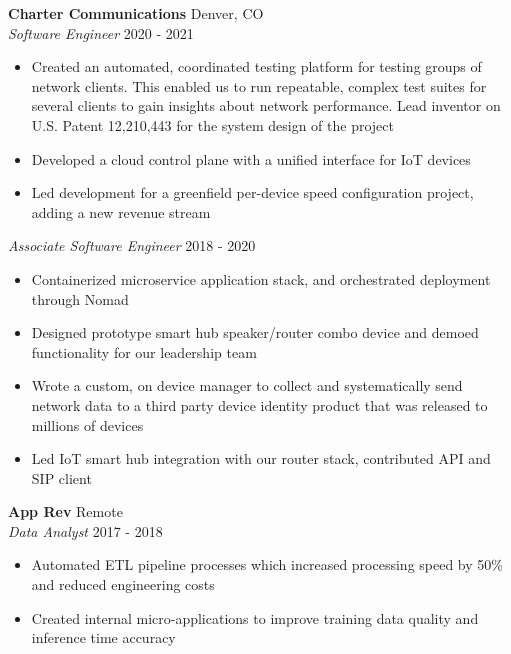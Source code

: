 \documentclass[a4paper]{article}
\begin{document}
\textbf{Charter Communications} \hfill Denver, CO\\

\textit{Software Engineer} \hfill 2020 - 2021\\
\vspace{-1mm}
\begin{itemize} \itemsep 1pt
  \item Created an automated, coordinated testing platform for testing groups of network clients. 
    This enabled us to run repeatable, complex test suites for several clients 
    to gain insights about network performance. Lead inventor on U.S. Patent 12,210,443 for the system design of the project
  \item Developed a cloud control plane with a unified interface for IoT devices
  \item Led development for a greenfield per-device speed configuration project,
    adding a new revenue stream

\end{itemize}

\textit{Associate Software Engineer} \hfill 2018 - 2020\\
\vspace{-1mm}
\begin{itemize} \itemsep 1pt
	\item Containerized microservice application stack, and orchestrated deployment through Nomad
	\item Designed prototype smart hub speaker/router combo device and demoed functionality for our leadership team
	\item Wrote a custom, on device manager to collect and systematically send network data to a third party device identity product that was released to millions of devices
	\item Led IoT smart hub integration with our router stack, contributed API and SIP client
\end{itemize}

\textbf{App Rev} \hfill Remote\\
\textit{Data Analyst} \hfill 2017 - 2018\\
\vspace{-1mm}
\begin{itemize} \itemsep 1pt
	\item Automated ETL pipeline processes which increased processing speed by 50\% and reduced engineering costs
	\item Created internal micro-applications to improve training data quality and inference time accuracy
\end{itemize}
\end{document}
